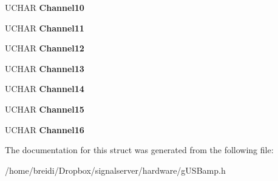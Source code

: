 \begin{DoxyCompactItemize}
\item 
\hypertarget{struct___c_h_a_n_n_e_l_a7d78d2775b7e056819a76971a116651a}{
UCHAR {\bfseries Channel10}}
\label{struct___c_h_a_n_n_e_l_a7d78d2775b7e056819a76971a116651a}

\item 
\hypertarget{struct___c_h_a_n_n_e_l_ac169ea4fea8690f5d7149a7918f1baa3}{
UCHAR {\bfseries Channel11}}
\label{struct___c_h_a_n_n_e_l_ac169ea4fea8690f5d7149a7918f1baa3}

\item 
\hypertarget{struct___c_h_a_n_n_e_l_ae5992b1614a2004297958e7d1923be06}{
UCHAR {\bfseries Channel12}}
\label{struct___c_h_a_n_n_e_l_ae5992b1614a2004297958e7d1923be06}

\item 
\hypertarget{struct___c_h_a_n_n_e_l_a12036e58cca198b6ced6de50008bf0a8}{
UCHAR {\bfseries Channel13}}
\label{struct___c_h_a_n_n_e_l_a12036e58cca198b6ced6de50008bf0a8}

\item 
\hypertarget{struct___c_h_a_n_n_e_l_a308e02f9cb9d494270c5c403d6d177d8}{
UCHAR {\bfseries Channel14}}
\label{struct___c_h_a_n_n_e_l_a308e02f9cb9d494270c5c403d6d177d8}

\item 
\hypertarget{struct___c_h_a_n_n_e_l_a6da3ca3e67a417884a0c3165d3e49593}{
UCHAR {\bfseries Channel15}}
\label{struct___c_h_a_n_n_e_l_a6da3ca3e67a417884a0c3165d3e49593}

\item 
\hypertarget{struct___c_h_a_n_n_e_l_ac8d7ce453b87c1fc0fed0835238c5dda}{
UCHAR {\bfseries Channel16}}
\label{struct___c_h_a_n_n_e_l_ac8d7ce453b87c1fc0fed0835238c5dda}

\end{DoxyCompactItemize}


The documentation for this struct was generated from the following file:\begin{DoxyCompactItemize}
\item 
/home/breidi/Dropbox/signalserver/hardware/gUSBamp.h\end{DoxyCompactItemize}
